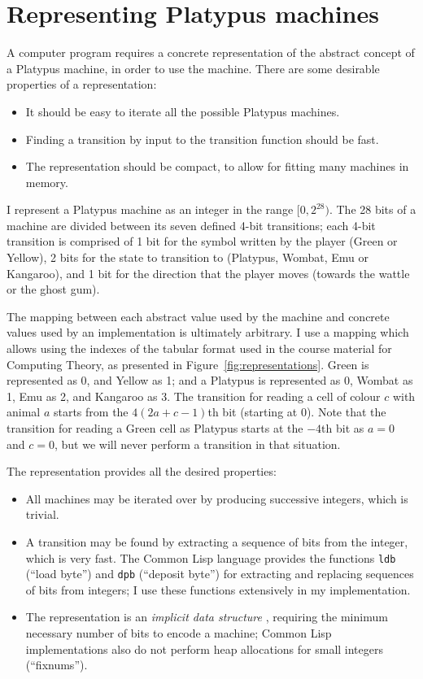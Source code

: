 \section{Representing Platypus machines}
\label{sec:representation}

A computer program requires a concrete representation of the abstract
concept of a Platypus machine, in order to use the machine.
There are some desirable properties of a representation:

\begin{itemize}
\item It should be easy to iterate all the possible Platypus machines.
\item Finding a transition by input to the transition function should be fast.%
\item The representation should be compact, to allow for fitting many
  machines in memory.
\end{itemize}

I represent a Platypus machine as an integer in the range
$[0, 2^{28})$. The 28 bits of a machine are divided between its seven
defined 4-bit transitions; each 4-bit transition is comprised of
1 bit for the symbol written by the player (Green or Yellow), 2 bits
for the state to transition to (Platypus, Wombat, Emu or Kangaroo),
and 1 bit for the direction that the player moves (towards the wattle
or the ghost gum).

The mapping between each abstract value used by the machine and
concrete values used by an implementation is ultimately arbitrary. I
use a mapping which allows using the indexes of the tabular format used
in the course material for Computing Theory, as presented in
Figure~\ref{fig:representations}. Green is represented as 0, and Yellow as 1;
and a Platypus is represented as 0, Wombat as 1, Emu as 2, and Kangaroo
as 3. The transition for reading a cell of colour $c$ with animal $a$
starts from the $4(2a + c - 1)$th bit (starting at 0). Note that the transition
for reading a Green cell as Platypus starts at the $-4$th bit as $a = 0$ and
$c = 0$, but we will never perform a transition in that situation.

The representation provides all the desired properties:

\begin{itemize}
\item All machines may be iterated over by producing successive
  integers, which is trivial.
\item A transition may be found by extracting a sequence of bits from
  the integer, which is very fast. The Common Lisp language \cite{common-lisp}
  provides the functions \texttt{ldb} (``load byte'') and
  \texttt{dpb} (``deposit byte'') for extracting and replacing sequences
  of bits from integers; I use these functions extensively in my implementation.
\item The representation is an \emph{implicit data structure}
  \cite{implicit-data-structures}, requiring the minimum necessary
  number of bits to encode a machine; Common Lisp implementations
  also do not perform heap allocations for small integers (``fixnums'').
\end{itemize}

